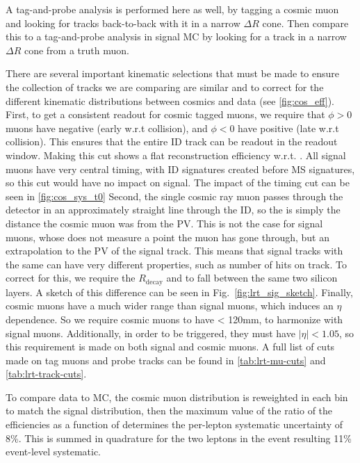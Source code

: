 A tag-and-probe analysis is performed here as well, by tagging a cosmic muon and looking for tracks back-to-back with it in a narrow $\Delta R$ cone. Then compare this to a tag-and-probe analysis in signal \ac{MC} by looking for a track in a narrow $\Delta R$ cone from a truth muon. 

There are several important kinematic selections that must be made to ensure the collection of tracks we are comparing are similar and to correct for the different kinematic distributions between cosmics and data (see \autoref{fig:cos_eff}). First, to get a consistent readout for cosmic tagged muons, we require that $\phi > 0$ muons have negative \tavg (early w.r.t collision), and $\phi < 0$ have positive \tavg (late w.r.t collision). This ensures that the entire \ac{ID} track can be readout in the readout window. Making this cut shows a flat reconstruction efficiency w.r.t. \tavg. All signal muons have very central timing, with \ac{ID} signatures created before \ac{MS} signatures, so this cut would have no impact on signal. The impact of the timing cut can be seen in \autoref{fig:cos_sys_t0} Second, the single cosmic ray muon passes through the detector in an approximately straight line through the \ac{ID}, so the \dz is simply the distance the cosmic muon was from the PV. This is not the case for signal muons, whose \dz does not measure a point the muon has gone through, but an extrapolation to the PV of the signal track. This means that signal tracks with the same \dz can have very different properties, such as number of hits on track. To correct for this, we require the $R_{\textrm{decay}}$ and \dz to fall between the same two silicon layers. A sketch of this difference can be seen in Fig.~\ref{fig:lrt_sig_sketch}. Finally, cosmic muons have a much wider \z range than signal muons, which induces an $\eta$ dependence. So we require cosmic muons to have \absz < 120mm, to harmonize with signal muons. Additionally, in order to be triggered, they must have $|\eta| < 1.05$, so this requirement is made on both signal and cosmic muons. A full list of cuts made on tag muons and probe tracks can be found in \autoref{tab:lrt-mu-cuts} and \autoref{tab:lrt-track-cuts}.

To compare data to MC, the cosmic muon \pt distribution is reweighted in each \absdz bin to match the signal distribution, then the maximum value of the ratio of the efficiencies as a function of \absdz determines the per-lepton systematic uncertainty of 8\%. This is summed in quadrature for the two leptons in the event resulting 11\% event-level systematic. 
 
